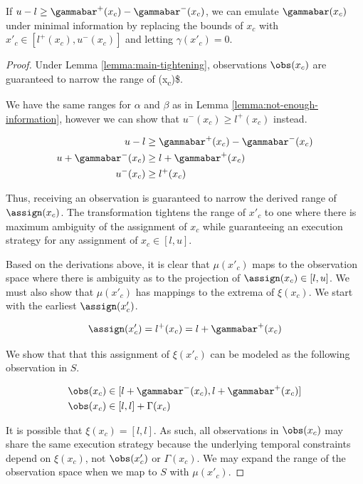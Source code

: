 \documentclass[11pt]{article}
\begin{document}
\begin{lemma}
\label{lemma:main-tightening}
If \(u - l \geq \gammabar^+(x_c) - \gammabar^-(x_c)\), we can emulate \(\gammabar(x_c)\) under minimal
information by replacing the bounds of \(x_c\) with \(x'_{c} \in [l^+(x_{c}), u^-(x_{c})]\) and letting
\(\gamma(x'_c) = 0\).
\end{lemma}

\begin{proof}
Under Lemma \ref{lemma:main-tightening}, observations \(\obs(x_{c})\) are guaranteed to narrow the range of
\assign(x\textsubscript{c})\$.

We have the same ranges for \(\alpha\) and \(\beta\) as in Lemma \ref{lemma:not-enough-information}, however
we can show that \(u^-(x_{c}) \geq l^+(x_{c})\) instead.

\begin{align*}
u - l &\geq \gammabar^+(x_c) - \gammabar^-(x_{c}) \\
u + \gammabar^-(x_{c}) &\geq l + \gammabar^+(x_{c}) \\
u^-(x_{c}) &\geq l^+(x_{c})
\end{align*}

Thus, receiving an observation is guaranteed to narrow the derived range of \(\assign(x_{c})\). The
transformation tightens the range of \(x'_{c}\) to one where there is maximum ambiguity of the
assignment of \(x_{c}\) while guaranteeing an execution strategy for any assignment of \(x_{c} \in [l,
u]\).

Based on the derivations above, it is clear that \(\mu(x'_{c})\) maps to the observation space where
there is ambiguity as to the projection of \(\assign(x_{c}) \in [l, u]\). We must also show that
\(\mu(x'_{c})\) has mappings to the extrema of \(\xi(x_{c})\). We start with the earliest
\(\assign(x'_{c})\).

$$
\assign(x'_{c}) = l^+(x_{c}) = l + \gammabar^+(x_{c})
$$

We show that that this assignment of \(\xi(x'_{c})\) can be modeled as the following observation in
\(S\).

\begin{align*}
\obs(x_{c}) &\in [l + \gammabar^-(x_{c}), l + \gammabar^+(x_{c})] \\
\obs(x_{c}) &\in [l, l] + \Gamma(x_{c})
\end{align*}

It is possible that \(\xi(x_{c}) = [l, l]\). As such, all observations in \(\obs(x_{c})\) may share the
same execution strategy because the underlying temporal constraints depend on \(\xi(x_{c})\), not
\(\obs(x'_{c})\) or \(\Gamma(x_{c})\). We may expand the range of the observation space when we map to
\(S\) with \(\mu(x'_{c})\).


\end{proof}
\end{document}
